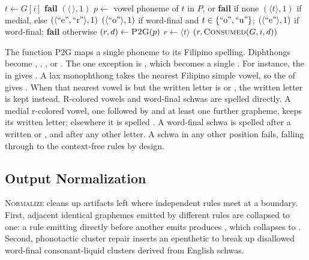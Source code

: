 \begin{algorithm}[t]
      \caption{Phonetic Resolution}\label{alg:phonetic}
      \begin{algorithmic}[1]
            \State $t \gets G[i]$
             \Return \textbf{fail}
            \EndIf
             \Return $(\langle\,\rangle, 1)$
            \EndIf
            \State $p \gets$ vowel phoneme of $t$ in $P$, or \textbf{fail} if none
            \State \Return $(\langle t \rangle, 1)$ if medial, else $(\langle \gr{e}, \gr{r} \rangle, 1)$
            \EndIf
            \State \Return $(\langle \gr{o} \rangle, 1)$ if word-final and $t \in \{\gr{o}, \gr{u}\}$;
            \State \quad $(\langle \gr{e} \rangle, 1)$ if word-final; \textbf{fail} otherwise
            \EndIf
            \State $(r, d) \gets \Call{P2G}{p}$
            \State $r \gets \langle t \rangle$
            \EndIf
            \State \Return $(r, \Call{Consumed}{G, i, d})$
            \EndProcedure
      \end{algorithmic}
\end{algorithm}

The function \textsc{P2G} maps a single phoneme to its Filipino spelling.
Diphthongs become , , , or . The one exception is
, which becomes a single . For instance, the  in
 gives . A lax monophthong takes the nearest Filipino simple
vowel, so the \ipa{\ae} of  gives . When that nearest vowel is
 but the written letter is  or , the written letter is kept
instead. R-colored vowels and word-final schwas are spelled directly. A medial
r-colored vowel, one followed by  and at least one further grapheme,
keeps its written letter; elsewhere it is spelled . A word-final schwa
is spelled  after a written  or , and  after any other
letter. A schwa in any other position fails, falling through to the
context-free rules by design.

\subsection{Output Normalization}\label{subsec:normalization}

\textsc{Normalize} cleans up artifacts left where independent rules meet at a
boundary. First, adjacent identical graphemes emitted by different rules are
collapsed to one: a rule emitting  directly before another emits 
produces , which collapses to . Second, phonotactic cluster
repair inserts an epenthetic  to break up disallowed word-final
consonant-liquid clusters derived from English schwas.